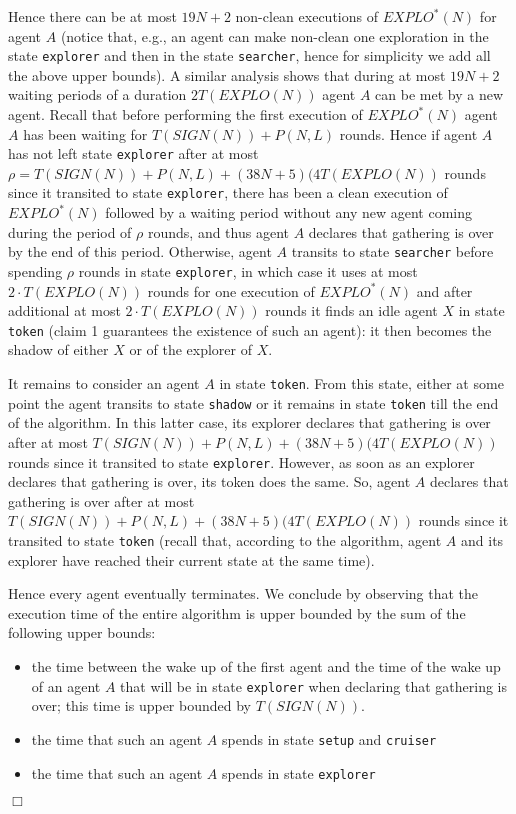 \documentclass[11pt]{article}
\newcommand{\qed}{\hfill $\Box$ \bigbreak}
\newenvironment{proof}{\noindent {\bf Proof.}}{\qed}
\begin{document}
\begin{proof}
         
      Hence there can be at most {$19N+2$} non-clean executions of $EXPLO^*(N)$ for agent $A$ 
     (notice that, e.g., an agent can make non-clean one exploration in the state 
     {\tt explorer} and then in the state {\tt searcher}, hence for simplicity we add all the above upper bounds). A similar analysis shows that during at most {$19N+2$}
     waiting periods of a duration $2T(EXPLO(N))$ agent $A$ can be met by a new agent. Recall that before performing the first  execution of $EXPLO^*(N)$ agent $A$ has been waiting for {$T(SIGN(N))+P(N,L)$ rounds}.
     {Hence if agent $A$ has not left state {\tt explorer} after at most $\rho=T(SIGN(N))+P(N,L) +(38N+5)(4T(EXPLO(N))$ rounds since it transited to state {\tt explorer}, there
     has been a clean execution of $EXPLO^*(N)$ followed by a waiting period without any new agent coming during the period of $\rho$ rounds, and thus agent $A$ declares that gathering is over by the end of this period. Otherwise, agent $A$ transits to state {\tt searcher} before spending $\rho$ rounds in state 
  {\tt explorer}, in which case it uses at most $2\cdot T(EXPLO(N))$ rounds for one execution of $EXPLO^*(N)$ and after
 additional at most  $2\cdot T(EXPLO(N))$ rounds it finds an idle agent $X$ in state {\tt token} (claim 1 guarantees the existence of such an agent): it then becomes 
 the shadow of either $X$ or of the explorer of $X$.}

  
    
  It remains to consider an agent $A$ in state {\tt token}. 
  From this state, either at some point the agent transits to state {\tt shadow} or it remains in state {\tt token} till the end of the algorithm. 
  In this latter case, its explorer declares that gathering is over after at most {$T(SIGN(N))+P(N,L) +(38N+5)(4T(EXPLO(N))$ rounds} since it transited to state 
   {\tt explorer}. However, as soon as an explorer declares that gathering is over, its token does the same. So, agent $A$ declares that gathering is over after at most  
 {$T(SIGN(N))+P(N,L) +(38N+5)(4T(EXPLO(N))$ rounds} since it transited to state {\tt token} (recall that, according to the algorithm, agent $A$ and its explorer have reached their current state at the same time).
   
   Hence every agent eventually terminates.
   We conclude by observing that the execution time of the entire algorithm is upper bounded by the sum of the following upper bounds:
   \begin{itemize}
   \item
   the time between the wake up of the first agent and the time of the wake up of an agent $A$ that will be in state {\tt explorer} when declaring that gathering is over; this time is upper bounded by {$T(SIGN(N))$}.
   \item
   the time that such an agent $A$ spends in state {\tt setup} and {\tt cruiser}
   \item
   the time that such an agent $A$ spends in state {\tt explorer}
   \end{itemize}
   

\end{proof}
\end{document}
